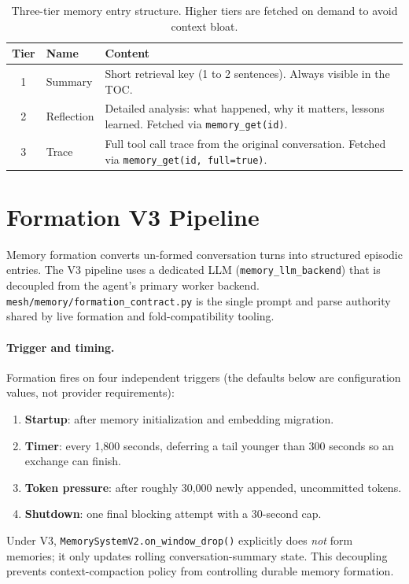 \documentclass[11pt,letterpaper]{report}
\newcommand{\code}[1]{\texttt{#1}}
\begin{document}
\begin{table}[h]
\centering
\small
\begin{tabular}{@{}clL{7cm}@{}}
\toprule
\textbf{Tier} & \textbf{Name} & \textbf{Content} \\
 & Summary   & Short retrieval key (1 to 2 sentences). Always visible
                in the TOC. \\
2 & Reflection & Detailed analysis: what happened, why it matters,
                  lessons learned. Fetched via \code{memory\_get(id)}. \\
3 & Trace      & Full tool call trace from the original conversation.
                  Fetched via \code{memory\_get(id, full=true)}. \\
\bottomrule
\end{tabular}
\caption{Three-tier memory entry structure. Higher tiers are fetched on
demand to avoid context bloat.}
\label{tab:memory-tiers}
\end{table}

\section{Formation V3 Pipeline}

Memory formation converts un-formed conversation turns into structured
episodic entries. The V3 pipeline uses a dedicated LLM
(\code{memory\_llm\_backend}) that is decoupled from the agent's primary
worker backend. \code{mesh/memory/formation\_contract.py} is the single
prompt and parse authority shared by live formation and fold-compatibility
tooling.

\paragraph{Trigger and timing.}
Formation fires on four independent triggers (the defaults below are
configuration values, not provider requirements):
\begin{enumerate}[nosep]
  \item \textbf{Startup}: after memory initialization and embedding migration.
  \item \textbf{Timer}: every 1,800 seconds, deferring a tail younger than
        300 seconds so an exchange can finish.
  \item \textbf{Token pressure}: after roughly 30,000 newly appended,
        uncommitted tokens.
  \item \textbf{Shutdown}: one final blocking attempt with a 30-second cap.
\end{enumerate}
Under V3, \code{MemorySystemV2.on\_window\_drop()} explicitly does
\emph{not} form memories; it only updates rolling conversation-summary state.
This decoupling prevents context-compaction policy from controlling durable
memory formation.
\end{document}
